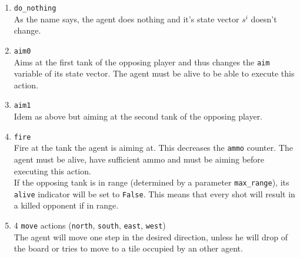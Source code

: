 \begin{enumerate}
    \item {\tt do\_nothing}\\
        As the name says, the agent does nothing and it's state vector $s^i$ doesn't change.
    \item {\tt aim0} \\
        Aims at the first tank of the opposing player and thus changes the {\tt aim} variable of its state vector. The agent must be alive to be able to execute this action.
    \item {\tt aim1} \\
        Idem as above but aiming at the second tank of the opposing player.
    \item {\tt fire} \\
        Fire at the tank the agent is aiming at. This decreases the {\tt ammo} counter. The agent must be alive, have sufficient ammo and must be aiming before executing this action.\\
        If the opposing tank is in range (determined by a parameter {\tt max\_range}), its {\tt alive} indicator will be set to {\tt False}. This means that every shot will result in a killed opponent if in range.
    \item 4 {\tt move} actions ({\tt north}, {\tt south}, {\tt east}, {\tt west})\\
        The agent will move one step in the desired direction, unless he will drop of the board or tries to move to a tile occupied by an other agent.
\end{enumerate}

